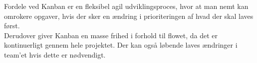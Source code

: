 Fordele ved Kanban er en fleksibel agil udviklingsproces, hvor at man nemt kan omrokere opgaver, hvis der sker en ændring i prioriteringen af hvad der skal laves først. \\
Derudover giver Kanban en masse frihed i forhold til flowet, da det er kontinuerligt gennem hele projektet. Der kan også løbende laves ændringer i team'et hvis dette er nødvendigt. \\



